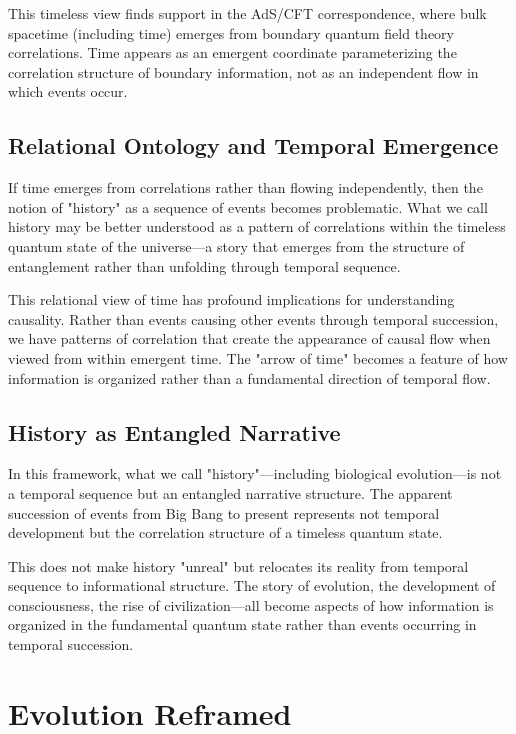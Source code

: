 \documentclass[12pt]{article}
\begin{document}
This timeless view finds support in the AdS/CFT correspondence, where bulk spacetime (including time) emerges from boundary quantum field theory correlations. Time appears as an emergent coordinate parameterizing the correlation structure of boundary information, not as an independent flow in which events occur.

\subsection{Relational Ontology and Temporal Emergence}

If time emerges from correlations rather than flowing independently, then the notion of "history" as a sequence of events becomes problematic. What we call history may be better understood as a pattern of correlations within the timeless quantum state of the universe—a story that emerges from the structure of entanglement rather than unfolding through temporal sequence.

This relational view of time has profound implications for understanding causality. Rather than events causing other events through temporal succession, we have patterns of correlation that create the appearance of causal flow when viewed from within emergent time. The "arrow of time" becomes a feature of how information is organized rather than a fundamental direction of temporal flow.

\subsection{History as Entangled Narrative}

In this framework, what we call "history"—including biological evolution—is not a temporal sequence but an entangled narrative structure. The apparent succession of events from Big Bang to present represents not temporal development but the correlation structure of a timeless quantum state. 

This does not make history "unreal" but relocates its reality from temporal sequence to informational structure. The story of evolution, the development of consciousness, the rise of civilization—all become aspects of how information is organized in the fundamental quantum state rather than events occurring in temporal succession.

\section{Evolution Reframed}
\end{document}
